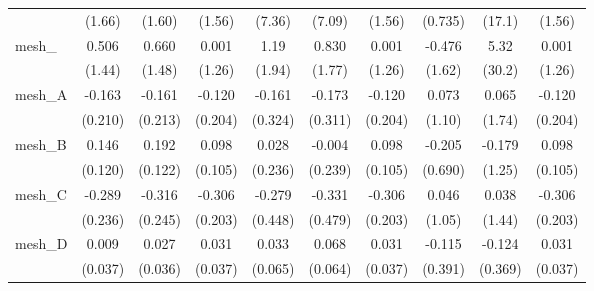 \begin{tabular}{lccccccccc}
                                                               & (1.66)         & (1.60)         & (1.56)        & (7.36)        & (7.09)        & (1.56)        & (0.735)       & (17.1)  & (1.56)\\   
   mesh\_                                                      & 0.506          & 0.660          & 0.001         & 1.19          & 0.830         & 0.001         & -0.476        & 5.32    & 0.001\\   
                                                               & (1.44)         & (1.48)         & (1.26)        & (1.94)        & (1.77)        & (1.26)        & (1.62)        & (30.2)  & (1.26)\\   
   mesh\_A                                                     & -0.163         & -0.161         & -0.120        & -0.161        & -0.173        & -0.120        & 0.073         & 0.065   & -0.120\\   
                                                               & (0.210)        & (0.213)        & (0.204)       & (0.324)       & (0.311)       & (0.204)       & (1.10)        & (1.74)  & (0.204)\\   
   mesh\_B                                                     & 0.146          & 0.192          & 0.098         & 0.028         & -0.004        & 0.098         & -0.205        & -0.179  & 0.098\\   
                                                               & (0.120)        & (0.122)        & (0.105)       & (0.236)       & (0.239)       & (0.105)       & (0.690)       & (1.25)  & (0.105)\\   
   mesh\_C                                                     & -0.289         & -0.316         & -0.306        & -0.279        & -0.331        & -0.306        & 0.046         & 0.038   & -0.306\\   
                                                               & (0.236)        & (0.245)        & (0.203)       & (0.448)       & (0.479)       & (0.203)       & (1.05)        & (1.44)  & (0.203)\\   
   mesh\_D                                                     & 0.009          & 0.027          & 0.031         & 0.033         & 0.068         & 0.031         & -0.115        & -0.124  & 0.031\\   
                                                               & (0.037)        & (0.036)        & (0.037)       & (0.065)       & (0.064)       & (0.037)       & (0.391)       & (0.369) & (0.037)\\   

\end{tabular}
